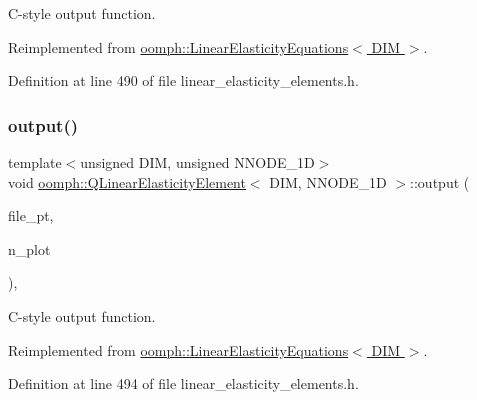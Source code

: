 C-\/style output function. 



Reimplemented from \hyperlink{classoomph_1_1LinearElasticityEquations_a5ece3b89bf886d39782820e449a4edaa}{oomph\+::\+Linear\+Elasticity\+Equations$<$ D\+I\+M $>$}.



Definition at line 490 of file linear\+\_\+elasticity\+\_\+elements.\+h.

\mbox{\label{classoomph_1_1QLinearElasticityElement_a0463c6394c7ef11cef70e036e8845743}} 
\subsubsection{\texorpdfstring{output()}{output()}\hspace{0.1cm}{\footnotesize\ttfamily [4/4]}}
{\footnotesize\ttfamily template$<$unsigned D\+IM, unsigned N\+N\+O\+D\+E\+\_\+1D$>$ \\
void \hyperlink{classoomph_1_1QLinearElasticityElement}{oomph\+::\+Q\+Linear\+Elasticity\+Element}$<$ D\+IM, N\+N\+O\+D\+E\+\_\+1D $>$\+::output (\begin{DoxyParamCaption}\item[{F\+I\+LE $\ast$}]{file\+\_\+pt,  }\item[{const unsigned \&}]{n\+\_\+plot }\end{DoxyParamCaption})\hspace{0.3cm}{\ttfamily [inline]}, {\ttfamily [virtual]}}



C-\/style output function. 



Reimplemented from \hyperlink{classoomph_1_1LinearElasticityEquations_ae48d7ecffb8e3c914a51947b5f79466c}{oomph\+::\+Linear\+Elasticity\+Equations$<$ D\+I\+M $>$}.



Definition at line 494 of file linear\+\_\+elasticity\+\_\+elements.\+h.

\mbox{\label{classoomph_1_1QLinearElasticityElement_a6f391511c442ee1ead6260df2e559c7e}} 
